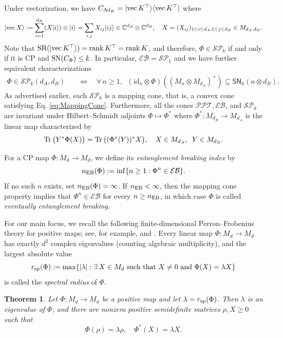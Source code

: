 \documentclass[11pt,reqno]{amsart}
\newtheorem{theorem}{Theorem}[section]
\theoremstyle{definition}
\theoremstyle{definition}
\theoremstyle{definition}
\theoremstyle{definition}
\newcommand{\la}{\langle}
\newcommand{\ra}{\rangle}
\newcommand{\Comp}{\mathbb{C}}
\newcommand{\id}{\mathrm{id}}
\newcommand{\sch}{\mathsf{SN}}
\newcommand{\SR}{{\rm SR}}
\newcommand{\SN}{{\rm SN}}
\newcommand{\SP}{\mathcal{SP}}
\newcommand{\EB}{\mathcal{EB}}
\newcommand{\PPT}{\mathcal{PPT}}
\newcommand{\Ad}{{\rm Ad}}
\newcommand{\vect}{{\rm vec\,}}
\begin{document}
Under vectorization, we have $C_{\Ad_K}=|\vect K^{\top}\ra\la \vect K^{\top}|$ where
    $$|\vect X\ra:= \sum_{i=1}^{d_B} (X|i\ra) \otimes |i\ra = \sum_{i,j} X_{ij}|ij\ra \in \Comp^{d_A}\otimes \Comp^{d_B}, \quad X=(X_{ij})_{1\leq i\leq d_A, 1\leq j\leq d_B}\in M_{d_A,d_B}.$$
Note that
$\SR(|\vect K^{\top}\ra)=\rank K^{\top} = \rank K$, and   therefore, $\Phi\in \SP_k$ if and only if it is CP and $\SN(C_{\Phi})\leq k$.
In particular, $\EB=\SP_1$ and we have further equivalent characterizations
\begin{align*}
    \Phi\in \SP_k(d_A,d_B) \quad &\iff \quad \forall\,n\geq 1, \;\;(\id_{n}\otimes \Phi)((M_{n}\otimes M_{d_A})^+)\subseteq \sch_k(n\otimes d_B).
\end{align*}
As advertised earlier, each $\SP_k$ is a mapping cone, that is, a convex cone satisfying Eq. \eqref{eq:MappingCone}. Furthermore, all the cones $\PPT, \EB$, and $\SP_k$ are invariant under Hilbert--Schmidt adjoints $\Phi\mapsto \Phi^*$ where $\Phi^*:M_{d_B}\to M_{d_A}$ is the linear map characterized by
    $$\Tr\big(Y^*\Phi(X)\big) = \Tr\big((\Phi^*(Y))^*X\big), \quad X\in M_{d_A},\;\; Y\in M_{d_B}.$$

For a CP map $\Phi:M_d\to M_d$, we define its \emph{entanglement breaking index} by
    $$n_{\rm EB}(\Phi) :=\inf\{n\geq 1:\Phi^n\in\EB\}.$$
If no such $n$ exists, set $n_{\rm EB}(\Phi)=\infty$. If $n_{\rm EB}<\infty$, then the mapping cone property implies that $\Phi^n\in \EB$ for every $n\geq n_{\rm EB}$, in which case $\Phi$ is called \emph{eventaully entanglement breaking}.

\medskip

For our main focus, we recall the following finite-dimensional Perron--Frobenius theory for positive maps; see, for example, \cite{EHK78,HRSF20} and \cite[Chapter 6]{Wol12}.
Every linear map $\Phi:M_d\to M_d$ has exactly $d^2$ complex eigenvalues (counting algebraic multiplicity), and the largest absolute value
    $$r_{\rm sp}(\Phi):=\max\{|\lambda|:\exists\, X\in M_d \text{ such that $X\neq 0$ and $\Phi(X)=\lambda X$}\}$$
is called the \emph{spectral radius} of $\Phi$. 

\begin{theorem}\label{thm:PF}
Let $\Phi:M_d\to M_d$ be a positive map and let
$\lambda=r_{\rm sp}(\Phi)$.  Then $\lambda$ is an eigenvalue of $\Phi$,
and there are nonzero positive semidefinite matrices $\rho,X\geq 0$ such that
    $$\Phi(\rho)=\lambda\rho, \quad \Phi^*(X)=\lambda X.$$
\end{theorem}
\end{document}
